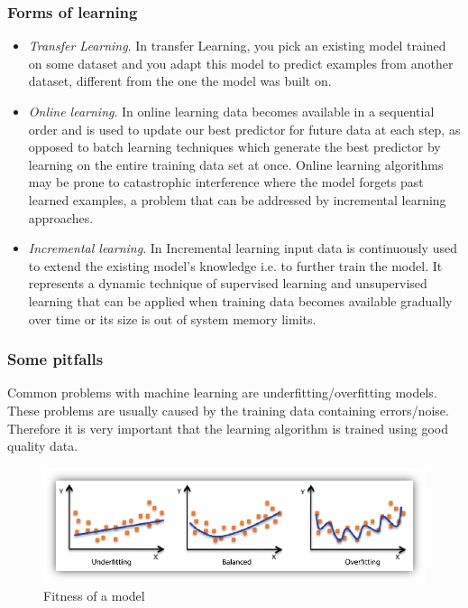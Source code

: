 \documentclass[pdftex,english,oribibl]{llncs}
\begin{document}
\subsubsection{Forms of learning\\}
\begin{itemize}
	\item \textit{Transfer Learning}. In transfer Learning, you pick an existing model trained on some dataset and you adapt this model to predict examples from another dataset, different from the one the model was built on.
	 \item \textit{Online learning}. In online learning data becomes available in a sequential order and is used to update our best predictor for future data at each step, as opposed to batch learning techniques which generate the best predictor by learning on the entire training data set at once. Online learning algorithms may be prone to catastrophic interference where the model forgets past learned examples, a problem that can be addressed by incremental learning approaches.
	 \item \textit{Incremental learning}. In Incremental learning input data is continuously used to extend the existing model's knowledge i.e. to further train the model. It represents a dynamic technique of supervised learning and unsupervised learning that can be applied when training data becomes available gradually over time or its size is out of system memory limits.
\end{itemize}
\subsubsection{Some pitfalls\\}
Common problems with machine learning are underfitting/overfitting models. These problems are usually caused by the training data containing errors/noise. Therefore it is very important that the learning algorithm is trained using good quality data.  
\begin{figure}[H]
\centering
	\includegraphics[totalheight=4cm]{figures/fitness2}
    \caption{Fitness of a model \cite{machineLearning}}
    \label{fig:fitness}
\end{figure}
\end{document}
